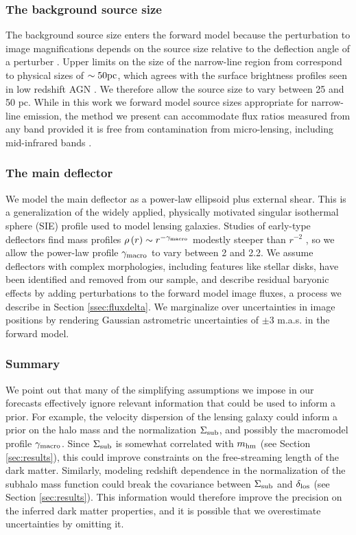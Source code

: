 \subsubsection{The background source size}
The background source size enters the forward model because the perturbation to image magnifications depends on the source size relative to the deflection angle of a perturber \cite{DoblerKeeton02}. Upper limits on the size of the narrow-line region from \cite{Nierenberg++17} correspond to physical sizes of $\sim 50 \rm{pc}$, which agrees with the surface brightness profiles seen in low redshift AGN \cite{MullerSanchez++11}. We therefore allow the source size to vary between 25 and 50 pc. While in this work we forward model source sizes appropriate for narrow-line emission, the method we present can accommodate flux ratios measured from any band provided it is free from contamination from micro-lensing, including mid-infrared bands \cite{Minezaki++09,MacLeod++13}. 

\subsubsection{The main deflector}
We model the main deflector as a power-law ellipsoid plus external shear. This is a generalization of the widely applied, physically motivated \cite[e.g.][]{Treu++06} singular isothermal sphere (SIE) profile used to model lensing galaxies. Studies of early-type deflectors find mass profiles $\rho\left(r\right) \sim r^{-\gamma_{\rm{macro}}}$ modestly steeper than $r ^{-2}$  \cite{Treu++09,Auger++10,Shankar++17}, so we allow the power-law profile $\gamma_{\rm{macro}}$ to vary between 2 and 2.2. We assume deflectors with complex morphologies, including features like stellar disks, have been identified and removed from our sample, and describe residual baryonic effects by adding perturbations to the forward model image fluxes, a process we describe in Section \ref{ssec:fluxdelta}. We marginalize over uncertainties in image positions by rendering Gaussian astrometric uncertainties of $\pm 3$ m.a.s. in the forward model.  

\subsubsection{Summary}
We point out that many of the simplifying assumptions we impose in our forecasts effectively ignore relevant information that could be used to inform a prior. For example, the velocity dispersion of the lensing galaxy could inform a prior on the halo mass and the normalization $\Sigma_{\rm{sub}}$, and possibly the macromodel profile $\gamma_{\rm{macro}}$. Since $\Sigma_{\rm{sub}}$ is somewhat correlated with ${m_{\rm{hm}}}$ (see Section \ref{sec:results}), this could improve constraints on the free-streaming length of the dark matter. Similarly, modeling redshift dependence in the normalization of the subhalo mass function could break the covariance between $\Sigma_{\rm{sub}}$ and $\delta_{\rm{los}}$ (see Section \ref{sec:results}). This information would therefore improve the precision on the inferred dark matter properties, and it is possible that we overestimate uncertainties by omitting it.    

